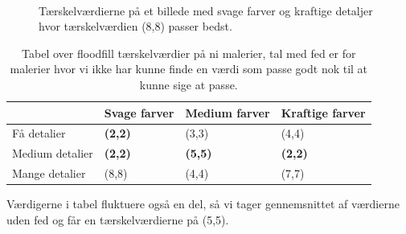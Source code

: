 \begin{figure}[!h]
    \centering
    \\
    \caption[]{Tærskelværdierne på et billede med svage farver og
	kraftige detaljer hvor tærskelværdien (8,8) passer bedst.}
    \label{Floodfillbilledet}
\end{figure}

\begin{table}[!h]
    \centering
    \begin{tabular}{| l | l | l | l |} \hline
        & Svage farver 		& Medium farver & Kraftige farver \\ \hline
        Få detalier 		& \textbf{(2,2)}	& (3,3)			& (4,4)\\ \hline
        Medium detalier 	& \textbf{(2,2)}	& \textbf{(5,5)}& \textbf{(2,2)}\\ \hline
        Mange detalier		& (8,8)				& (4,4)			& (7,7)\\ \hline
    \end{tabular}
    \caption{Tabel over floodfill tærskelværdier på ni malerier, tal med
    fed er for malerier hvor vi ikke har kunne finde en værdi som passe
    godt nok til at kunne sige at passe.}
    \label{thressholdsTabelFF}
\end{table}

Værdigerne i tabel fluktuere også en del, så vi tager
gennemsnittet af værdierne uden fed og får en tærskelværdierne på (5,5).
